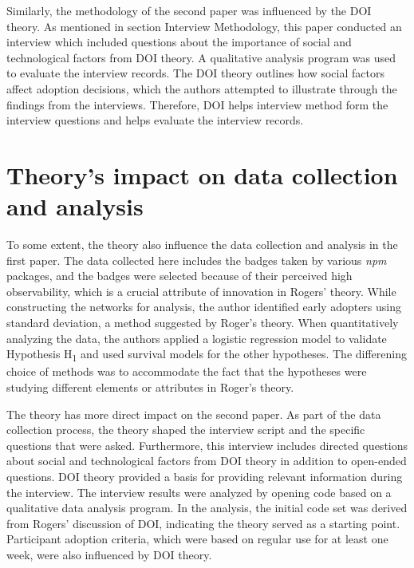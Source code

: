 \documentclass[journal,12pt,onecolumn,]{IEEEtran}
\begin{document}
Similarly, the methodology of the second paper was influenced by the DOI theory. As mentioned in section Interview Methodology, this paper conducted an interview which included questions about the importance of social and technological factors from DOI theory. 
A qualitative analysis program was used to evaluate the interview records. The DOI theory outlines how social factors affect adoption decisions, which the authors attempted to illustrate through the findings from the interviews. Therefore, DOI helps interview method form the interview questions and helps evaluate the interview records.
\section{Theory's impact on data collection and analysis}
To some extent, the theory also influence the data collection and analysis in the first paper. The data collected here includes the badges taken by various \textit{npm} packages, and the badges were selected because of their perceived high observability, which is a crucial attribute of innovation in Rogers' theory.
While constructing the networks for analysis, the author identified early adopters using standard deviation, a method suggested by Roger's theory.
When quantitatively analyzing the data, the authors applied a logistic regression model to validate Hypothesis H\textsubscript{1} and used survival models for the other hypotheses. The differening choice of methods was to accommodate the fact that the hypotheses were studying different elements or attributes in Roger's theory.

The theory has more direct impact on the second paper. As part of the data collection process, the theory shaped the interview script and the specific questions that were asked. Furthermore, this interview includes directed questions about social and technological factors from DOI theory in addition to open-ended questions. 
DOI theory provided a basis for providing relevant information during the interview. The interview results were analyzed by opening code based on a qualitative data analysis program. In the analysis, the initial code set was derived from Rogers' discussion of DOI, indicating the theory served as a starting point. 
Participant adoption criteria, which were based on regular use for at least one week, were also influenced by DOI theory.
\end{document}
